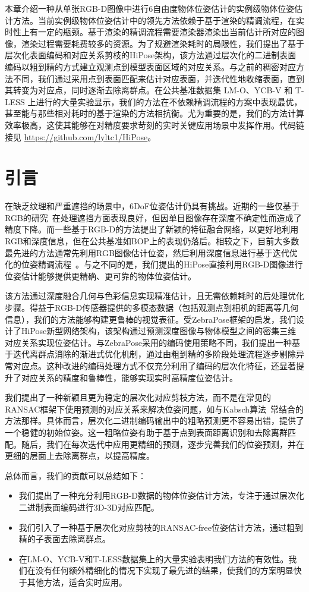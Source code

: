 本章介绍一种从单张RGB-D图像中进行6自由度物体位姿估计的实例级物体位姿估计方法。当前实例级物体位姿估计中的领先方法\cite{Sundermeyer2023BOPC2}依赖于基于渲染的精调流程，在实时性上有一定的瓶颈。基于渲染的精调流程需要渲染器渲染出当前估计所对应的图像，渲染过程需要耗费较多的资源。为了规避渲染耗时的局限性，我们提出了基于层次化表面编码和对应关系剪枝的HiPose架构，该方法通过层次化的二进制表面编码以粗到精的方式建立观测点到模型表面区域的对应关系。与之前的稠密对应方法不同，我们通过采用点到表面匹配来估计对应表面，并迭代性地收缩表面，直到其转变为对应点，同时逐渐去除离群点。在公共基准数据集 LM-O、YCB-V 和 T-LESS 上进行的大量实验显示，我们的方法在不依赖精调流程的方案中表现最优，甚至能与那些相对耗时的基于渲染的方法相抗衡。尤为重要的是，我们的方法计算效率极高，这使其能够在对精度要求苛刻的实时关键应用场景中发挥作用。代码链接见 \url{https://github.com/lyltc1/HiPose}。

\section{引言}
在缺乏纹理和严重遮挡的场景中，6DoF位姿估计仍具有挑战。近期的一些仅基于RGB的研究~\cite{zakharov2019dpod,park2019pix2pose,su2022zebrapose}在处理遮挡方面表现良好，但因单目图像存在深度不确定性而造成了精度下降。而一些基于RGB-D的方法\cite{wang2019densefusion, he2020pvn3d,he2021ffb6d,zhou2023deep}提出了新颖的特征融合网络，以更好地利用RGB和深度信息，但在公共基准如BOP\cite{Sundermeyer2023BOPC2}上的表现仍落后。相较之下，目前大多数最先进的方法通常先利用RGB图像估计位姿，然后利用深度信息进行基于迭代优化的位姿精调流程~\cite{Rusinkiewicz2001EfficientVO,lipson2022coupled}。与之不同的是，我们提出的HiPose直接利用RGB-D图像进行位姿估计能够提供更精确、更可靠的物体位姿估计。

该方法通过深度融合几何与色彩信息实现精准估计，且无需依赖耗时的后处理优化步骤。得益于RGB-D传感器提供的多模态数据（包括观测点到相机的距离等几何信息），我们的方法能够构建更鲁棒的视觉表征。受ZebraPose\cite{su2022zebrapose}框架的启发，我们设计了HiPose新型网络架构，该架构通过预测深度图像与物体模型之间的密集三维对应关系实现位姿估计。与ZebraPose采用的编码使用策略不同，我们提出一种基于迭代离群点消除的渐进式优化机制，通过由粗到精的多阶段处理流程逐步剔除异常对应点。这种改进的编码处理方式不仅充分利用了编码的层次化特征，还显著提升了对应关系的精度和鲁棒性，能够实现实时高精度位姿估计。

我们提出了一种新颖且更为稳定的层次化对应剪枝方法，而不是在常见的RANSAC框架下使用预测的对应关系来解决位姿问题，如与Kabsch算法~\cite{umeyama1991least}常结合的方法那样。具体而言，层次化二进制编码输出中的粗略预测更不容易出错，提供了一个稳健的初始位姿。这一粗略位姿有助于基于点到表面距离识别和去除离群匹配。随后，我们在每次迭代中应用更精细的预测，逐步完善我们的位姿预测，并在更细的层面上去除离群点，以提高精度。

总体而言，我们的贡献可以总结如下：
\begin{itemize}
\item 我们提出了一种充分利用RGB-D数据的物体位姿估计方法，专注于通过层次化二进制表面编码进行3D-3D对应匹配。
\item 我们引入了一种基于层次化对应剪枝的RANSAC-free位姿估计方法，通过粗到精的子表面去除离群点。
\item 在LM-O、YCB-V和T-LESS数据集上的大量实验表明我们方法的有效性。我们在没有任何额外精细化的情况下实现了最先进的结果，使我们的方案明显快于其他方法，适合实时应用。
\end{itemize}
